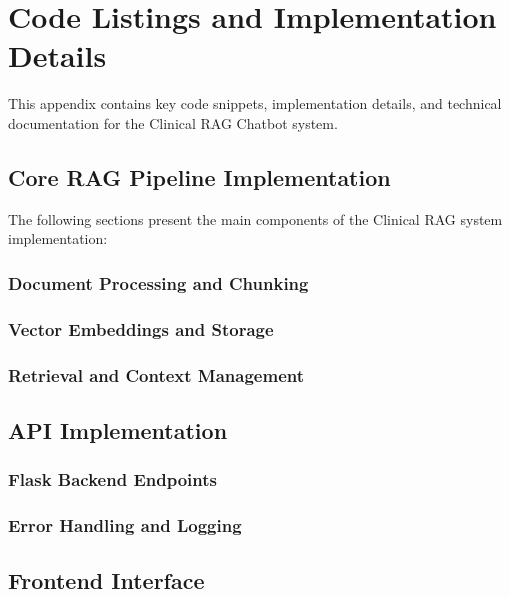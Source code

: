 \chapter{Code Listings and Implementation Details}
\label{appendix:code}

This appendix contains key code snippets, implementation details, and technical documentation for the Clinical RAG Chatbot system.

\section{Core RAG Pipeline Implementation}

The following sections present the main components of the Clinical RAG system implementation:

\subsection{Document Processing and Chunking}

\subsection{Vector Embeddings and Storage}

\subsection{Retrieval and Context Management}

\section{API Implementation}

\subsection{Flask Backend Endpoints}

\subsection{Error Handling and Logging}

\section{Frontend Interface}

